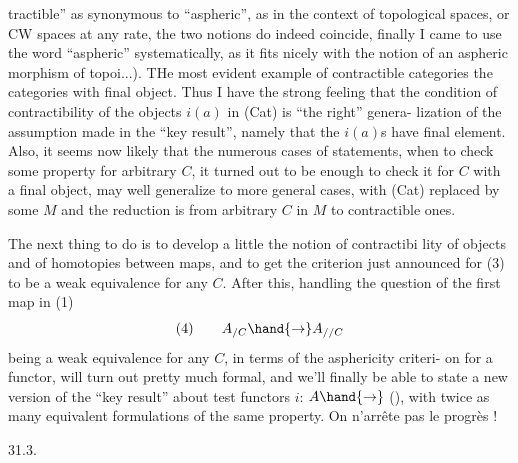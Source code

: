 tractible'' as synonymous to ``aspheric'', as  in the context of
topological spaces, or CW spaces at any rate, the two notions do indeed
coincide, finally I came to use  the word ``aspheric'' systematically, as it
fits nicely with the notion of an aspheric morphism of topoi...). THe
most evident example  of contractible categories   the categories
with final object. Thus I have the strong feeling that the condition of
contractibility of the  objects $i(a)$ in (Cat) is ``the right'' genera-%
lization of the assumption made in the ``key result'', namely
that the $i(a)$s have final element. Also, it seems now likely that the
numerous cases of statements, when to check some property for arbitrary
$C$, it turned out to be enough to check it for  $C$ with a final
object, may well generalize to more general cases, with (Cat) replaced
by some $M$ and the reduction is from arbitrary $C$ in $M$ to contractible ones.

The next thing to do is to develop a little the notion of contractibi%
lity of objects and of homotopies between maps, and to get the criterion
just announced for (3) to be a weak equivalence for any $C$. After this,
handling the question of the first map in (1)
\[ \text{(4)} \qquad A_{/C} \hand{\to} A_{//C} \]
being a weak equivalence for any $C$, in terms of the asphericity criteri-%
on for a functor, will turn out pretty much formal, and we'll finally
be able to state a new version of the ``key result'' about test functors
$i$: $A \hand{\to}$ (), with  twice as many equivalent formulations of the same
property. On n'arrête pas le progrès !

31.3.

